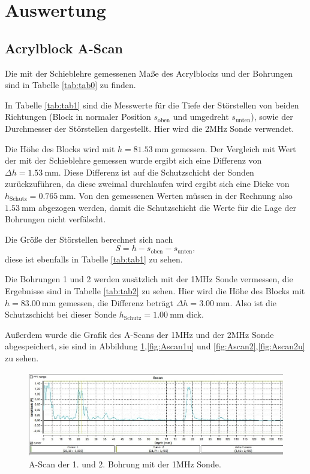 \section{Auswertung}
\label{sec:Auswertung}

\subsection{Acrylblock A-Scan}
Die mit der Schieblehre gemessenen Maße des Acrylblocks und der Bohrungen sind in
Tabelle \ref{tab:tab0} zu finden.


In Tabelle \ref{tab:tab1} sind die Messwerte für die Tiefe der Störstellen
von beiden Richtungen (Block in normaler Position $s_{\text{oben}}$ und
umgedreht $s_{\text{unten}}$), sowie der Durchmesser der Störstellen
dargestellt. Hier wird die 2\;MHz Sonde verwendet.

Die Höhe des Blocks wird mit $h=\SI{81,53}{\mm}$ gemessen.
Der Vergleich mit Wert der mit der Schieblehre gemessen wurde ergibt sich eine Differenz von
$\Delta h =\SI{1,53}{\mm}$. Diese Differenz ist auf die Schutzschicht der Sonden zurückzuführen,
da diese zweimal durchlaufen wird ergibt sich eine Dicke von $h_{\text{Schutz}}=\SI{0,765}{\mm}$.
Von den gemessenen Werten müssen in der Rechnung also $\SI{1,53}{\mm}$ abgezogen werden, damit die
Schutzschicht die Werte für die Lage der Bohrungen nicht verfälscht.

Die Größe der Störstellen berechnet sich nach
\begin{equation}
  S=h-s_{\text{oben}} -s_{\text{unten}},
  \label{eqn:größe}
\end{equation}
diese ist ebenfalls in Tabelle \ref{tab:tab1} zu sehen.

Die Bohrungen 1 und 2 werden zusätzlich mit der 1\;MHz Sonde vermessen, die
Ergebnisse sind in Tabelle \ref{tab:tab2} zu sehen. Hier wird die Höhe des
Blocks mit $h=\SI{83,00}{\mm}$ gemessen, die Differenz beträgt
$\Delta h =\SI{3,00}{\mm}$. Also ist die Schutzschicht bei dieser Sonde
$h_{\text{Schutz}}=\SI{1,00}{\mm}$ dick.


Außerdem wurde die Grafik des A-Scans der 1\;MHz und der 2\;MHz Sonde abgespeichert,
sie sind in Abbildung \ref{fig:Ascan1},\ref{fig:Ascan1u} und \ref{fig:Ascan2},\ref{fig:Ascan2u} zu sehen.


\begin{figure}[H]
  \centering
  \includegraphics[width=16cm]{Ascanklein.jpg}
  \caption{A-Scan der 1. und 2. Bohrung mit der 1\;MHz Sonde.}
  \label{fig:Ascan1}
\end{figure}

